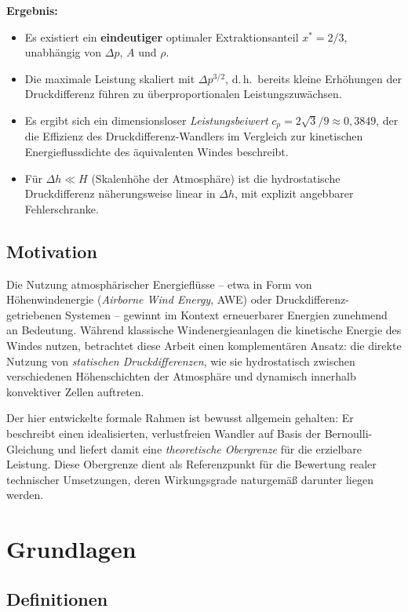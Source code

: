 ﻿\documentclass[a4paper,12pt]{article}
\theoremstyle{definition}
\begin{document}
\textbf{Ergebnis:}
\begin{itemize}
	\item Es existiert ein \textbf{eindeutiger} optimaler Extraktionsanteil
	$x^\ast = 2/3$, unabhängig von $\Delta p$, $A$ und $\rho$.
	\item Die maximale Leistung skaliert mit $\Delta p^{3/2}$, d.\,h.\
	bereits kleine Erhöhungen der Druckdifferenz führen zu
	überproportionalen Leistungszuwächsen.
	\item Es ergibt sich ein dimensionsloser \emph{Leistungsbeiwert}
	$c_p = 2\sqrt{3}/9 \approx 0{,}3849$, der die Effizienz des
	Druckdifferenz-Wandlers im Vergleich zur kinetischen
	Energieflussdichte des äquivalenten Windes beschreibt.
	\item Für $\Delta h \ll H$ (Skalenhöhe der Atmosphäre) ist die
	hydrostatische Druckdifferenz näherungsweise linear in $\Delta h$,
	mit explizit angebbarer Fehlerschranke.
\end{itemize}

\subsection{Motivation}

Die Nutzung atmosphärischer Energieflüsse -- etwa in Form von
Höhenwindenergie (\emph{Airborne Wind Energy}, AWE) oder
Druckdifferenz-getriebenen Systemen -- gewinnt im Kontext erneuerbarer
Energien zunehmend an Bedeutung. Während klassische Windenergieanlagen die
kinetische Energie des Windes nutzen, betrachtet diese Arbeit einen
komplementären Ansatz: die direkte Nutzung von \emph{statischen
Druckdifferenzen}, wie sie hydrostatisch zwischen verschiedenen
Höhenschichten der Atmosphäre und dynamisch innerhalb konvektiver Zellen
auftreten.

Der hier entwickelte formale Rahmen ist bewusst allgemein gehalten: Er
beschreibt einen idealisierten, verlustfreien Wandler auf Basis der
Bernoulli-Gleichung und liefert damit eine \emph{theoretische Obergrenze}
für die erzielbare Leistung. Diese Obergrenze dient als Referenzpunkt für
die Bewertung realer technischer Umsetzungen, deren Wirkungsgrade
naturgemäß darunter liegen werden.

\section{Grundlagen}

\subsection{Definitionen}
\end{document}
